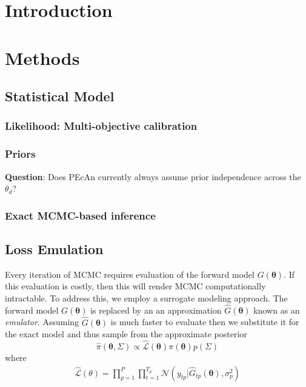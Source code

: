 \documentclass[12pt]{article}
\newcommand{\btheta}{\boldsymbol{\theta}}
\begin{document}
\section{Introduction}

\section{Methods}

\subsection{Statistical Model}
\subsubsection{Likelihood: Multi-objective calibration}

\subsubsection{Priors}

\bigskip
\noindent
\textbf{Question}: Does PEcAn currently always assume prior independence across the $\theta_d$? 

\subsubsection{Exact MCMC-based inference}

\subsection{Loss Emulation}
Every iteration of MCMC requires evaluation of the forward model $G(\btheta)$. If this evaluation is costly, then this will render MCMC computationally intractable. To address this, we employ a surrogate modeling approach. 
The forward model $G(\btheta)$ is replaced by an an approximation $\hat{G}(\btheta)$ known as an \textit{emulator}. Assuming $\hat{G}(\btheta)$ is much faster to evaluate then we substitute it for the exact model and thus 
sample from the approximate posterior
 \[\hat{\pi}(\btheta, \Sigma) \propto \hat{\mathcal{L}}(\btheta)\pi(\btheta)p(\Sigma)\]
 where 
 \begin{align*}
\hat{\mathcal{L}}(\theta) = \prod_{p = 1}^{P} \prod_{t = 1}^{T_p} \mathcal{N}\left(y_{tp}| \hat{G}_{tp}(\btheta), \sigma_p^2 \right)
\end{align*}
 
\end{document}
